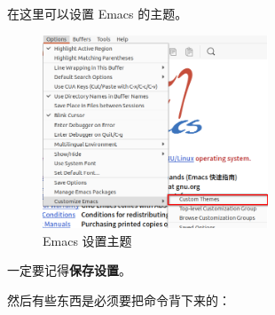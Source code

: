\documentclass[UTF-8]{ctexart}
\begin{document}
				在这里可以设置 Emacs 的主题。
				
				\begin{figure}[H]
					\centering
					\includegraphics[width=0.6\textwidth]{fig/emacs_themes.png}
					\caption*{Emacs 设置主题}
				\end{figure}
				
				一定要记得\textbf{\large 保存设置}。
				
				然后有些东西是必须要把命令背下来的：
				
\end{document}

